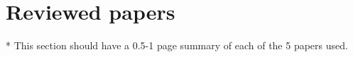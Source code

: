 \section{Reviewed papers}
* This section should have a 0.5-1 page summary of each of the 5 papers used.  
